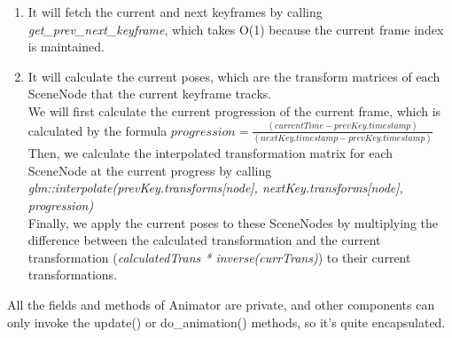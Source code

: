 \documentclass {article}
\begin{document}
\begin{enumerate}
\begin{enumerate}
\begin{enumerate}
            \item It will fetch the current and next keyframes by calling \textit{get\_prev\_next\_keyframe}, which takes O(1) because the current frame index is maintained.
            \item It will calculate the current poses, which are the transform matrices of each SceneNode that the current keyframe tracks. \\
                We will first calculate the current progression of the current frame, which is calculated by the formula $progression = \frac{(currentTime-prevKey.timestamp)}{(nextKey.timestamp-prevKey.timestamp)}$ \\
                Then, we calculate the interpolated transformation matrix for each SceneNode at the current progress by calling \textit{glm::interpolate(prevKey.transforms[node], nextKey.transforms[node], progression)} \\
                Finally, we apply the current poses to these SceneNodes by multiplying the difference between the calculated transformation and the current transformation (\textit{calculatedTrans * inverse(currTrans)}) to their current transformations.
        \end{enumerate}
    \end{enumerate}
\end{enumerate}
All the fields and methods of Animator are private, and other components can only invoke the update() or do\_animation() methods, so it's quite encapsulated.
\end{document}
